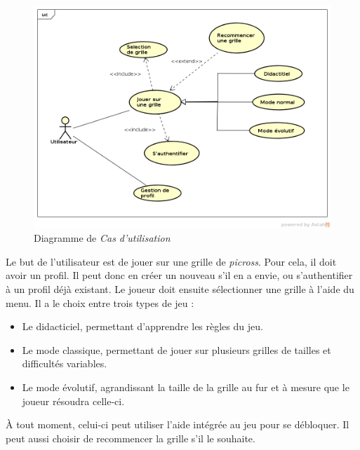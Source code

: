 \documentclass{report}
\begin{document}
    \begin{figure}[H]
	\caption{Diagramme de \textit{Cas d’utilisation}}
	\includegraphics[width=17cm]{../UML/UseCase_diagram/UseCase1.png}
    \end{figure}
    

	Le but de l'utilisateur est de jouer sur une grille de \textit{picross}.
Pour cela, il doit avoir un profil. Il peut donc en créer un nouveau s'il en a envie, ou s'authentifier à un profil déjà existant.
	Le joueur doit ensuite sélectionner une grille à l'aide du menu. Il a le choix entre trois types de jeu :
	\begin{itemize}
	\item Le didacticiel, permettant d'apprendre les règles du jeu. 
	\item Le mode classique, permettant de jouer sur plusieurs grilles de tailles et difficultés variables.
	\item Le mode évolutif, agrandissant la taille de la grille au fur et à mesure que le joueur résoudra celle-ci.
	\end{itemize}
	À tout moment, celui-ci peut utiliser l'aide intégrée au jeu pour se débloquer. Il peut aussi choisir de recommencer la grille s'il le souhaite.

      
\end{document}

